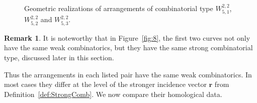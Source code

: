 \documentclass[11pt]{article}
\theoremstyle{plain}
\theoremstyle{definition}
\newtheorem{remark}[thm]{Remark}
\begin{document}
\begin{figure}[ht!]
\begin{minipage}[t]{0.33\textwidth}
\centering
{}
\end{minipage}
\begin{minipage}[t]{0.33\textwidth}
\centering
{}
\end{minipage}
\begin{minipage}[t]{0.33\textwidth}
\centering
{}
\end{minipage}
\caption{Geometric realizations of arrangements of combinatorial type $W^{2,2}_{5,1}$, $W^{2,2}_{5,2}$ and $W^{2,2}_{5,3}$.}
\label{fig:W22-5}
\end{figure}

\newpage
\begin{remark}
    It is noteworthy that in Figure~\ref{fig:8}, the first two curves not only have the same weak combinatorics, but they have the same strong combinatorial type, discussed later in this section.
\end{remark}
Thus the arrangements in each listed pair have the same weak combinatorics. In most cases they differ at the level of the stronger incidence vector $\mathbf r$ from Definition~\ref{def:StrongComb}. We now compare their homological data.
\end{document}
